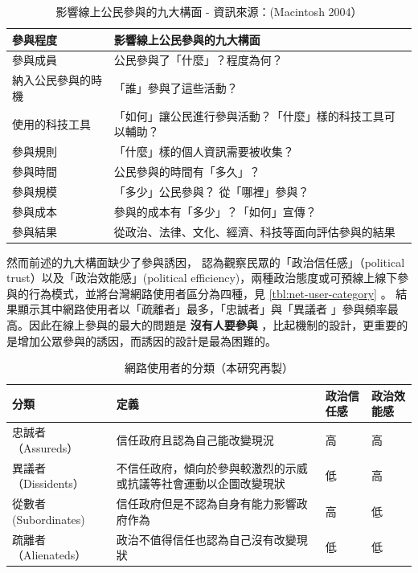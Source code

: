 \documentclass[12pt,a4paper]{article}
\begin{document}
\begin{table}[htbp]
\caption{\label{tab:orgce01001}
影響線上公民參與的九大構面 - 資訊來源：(Macintosh 2004）}
\centering
\begin{tabular}{ll}
\toprule
參與程度 & 影響線上公民參與的九大構面\\
\midrule
參與成員 & 公民參與了「什麼」？程度為何？\\
納入公民參與的時機 & 「誰」參與了這些活動？\\
使用的科技工具 & 「如何」讓公民進行參與活動？「什麼」樣的科技工具可以輔助？\\
參與規則 & 「什麼」樣的個人資訊需要被收集？\\
參與時間 & 公民參與的時間有「多久」？\\
參與規模 & 「多少」公民參與？  從「哪裡」參與？\\
參與成本 & 參與的成本有「多少」？「如何」宣傳？\\
參與結果 & 從政治、法律、文化、經濟、科技等面向評估參與的結果\\
\bottomrule
\end{tabular}
\end{table}

然而前述的九大構面缺少了參與誘因，\citep*{wang17}  認為觀察民眾的「政治信任感」（political trust）以及「政治效能感」(political efficiency)，兩種政治態度或可預線上線下參與的行為模式，並將台灣網路使用者區分為四種，見 \ref{tbl:net-user-category} 。
結果顯示其中網路使用者以「疏離者」最多，「忠誠者」與「異議者 」參與頻率最高。因此在線上參與的最大的問題是 \textbf{沒有人要參與} ，比起機制的設計，更重要的是增加公眾參與的誘因，而誘因的設計是最為困難的。

\begin{table}[htbp]
\caption{\label{tab:org10ddd28}
網路使用者的分類（本研究再製）}
\centering
\begin{tabular}{llll}
\toprule
分類 & 定義 & 政治信任感 & 政治效能感\\
\midrule
忠誠者（Assureds） & 信任政府且認為自己能改變現況 & 高 & 高\\
異議者（Dissidents） & 不信任政府，傾向於參與較激烈的示威或抗議等社會運動以企圖改變現狀 & 低 & 高\\
從數者 (Subordinates) & 信任政府但是不認為自身有能力影響政府作為 & 高 & 低\\
疏離者（Alienateds） & 政治不值得信任也認為自己沒有改變現狀 & 低 & 低\\
\bottomrule
\end{tabular}
\end{table}
\end{document}
